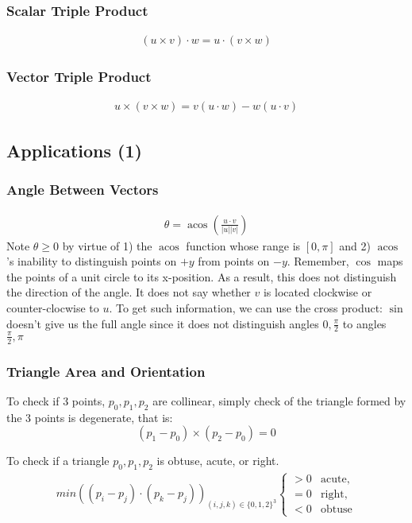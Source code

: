 \documentclass[12pt]{report}
\DeclareMathOperator{\acos}{acos}
\begin{document}
	\subsubsection{Scalar Triple Product}
	\begin{align}(u \times v) \cdot w = u \cdot (v \times w)\end{align}
	\subsubsection{Vector Triple Product}
	\begin{align}u \times (v \times w) = v(u \cdot w) - w(u \cdot v)\end{align}
	\subsection{Applications (1)}
		\subsubsection{Angle Between Vectors}
		\begin{align}
		\theta = \acos\left(\frac{u \cdot v}{|u||v|}\right)
		\end{align}
		Note $\theta \geq 0$ by virtue of 1) the $\acos$ function whose range is $[0, \pi]$ and 2) $\acos$'s inability to distinguish points on $+y$ from points on $-y$. Remember, $\cos$ maps the points of a unit circle to its x-position. As a result, this does not distinguish the direction of the angle. It does not say whether $v$ is located clockwise or counter-clocwise to $u$. To get such information, we can use the cross product:
		$\sin$ doesn't give us the full angle since it does not distinguish angles $0, \frac{\pi}{2}$ to angles $\frac{\pi}{2}, \pi$
		
		\subsubsection{Triangle Area and Orientation}
		
		To check if 3 points, ${p_0, p_1, p_2}$ are collinear, simply check of the triangle formed by the 3 points is degenerate, that is:
		$$
		(p_1-p_0)\times (p_2-p_0) = 0
		$$
		
		To check if a triangle ${p_0, p_1, p_2}$ is obtuse, acute, or right.
		\begin{align}
		min((p_i - p_j) \cdot (p_k - p_j))_{ (i,j,k) \in \{0,1,2\}^3}
		\begin{cases}
	            > 0 &\text{acute},\\
	            = 0 & \text{right}, \\
	            < 0 & \text{obtuse}
	        \end{cases}
		\end{align}
		
\end{document}
